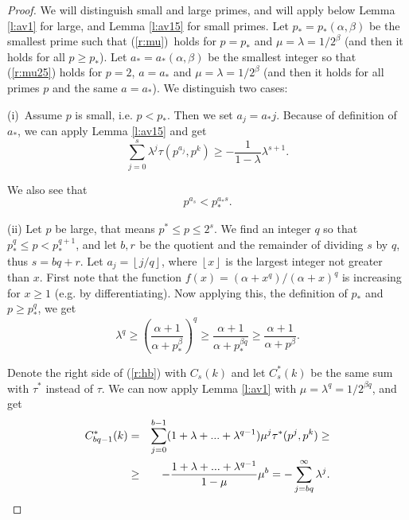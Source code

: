 \documentclass{amsart}
\numberwithin {equation}{section}
\begin{document}
\begin{proof}
We will distinguish small and large primes, and will apply below Lemma \ref{l:av1} for large, and Lemma \ref{l:av15} for small primes. Let $p_{\ast
}=p_{\ast }(\alpha ,\beta )$ be the smallest prime such that (\ref{r:mu})\
holds for $p=p_{\ast }$ and $\mu =\lambda =1/2^{\beta }$ (and then it holds
for all $p\geq p_{\ast }$). Let $a_{\ast }=a_{\ast }(\alpha ,\beta )$ be the
smallest integer so that (\ref{r:mu25}) holds for $p=2$, $a=a_{\ast }$ and $\mu =\lambda =1/2^{\beta }$ (and then it holds for all primes $p$ and the
same $a=a_{\ast }$). We distinguish two cases:

(i)\ Assume $p$ is small, i.e. $p<p_{\ast }$. Then we set $a_{j}=a_{\ast }j$. Because of definition of $a_{\ast }$, we can apply Lemma \ref{l:av15} and
get 
\begin{equation}
\sum _{j=0}^{s}\lambda ^{j}\tau (p^{a_{j}},p^{k})\geq -\frac{1}{1-\lambda }\lambda ^{s+1}{\text {.}}  \label{r:finalA}
\end{equation}

We also see that 
\begin{equation}
p^{a_{s}}<p_{\ast }^{a_{\ast }s}{\text {.}}  \label{r:finalB}
\end{equation}

(ii) Let $p$ be large, that means $p^{\ast }\leq p\leq 2^{s}$. We find an
integer $q$ so that $p_{\ast }^{q}\leq p<p_{\ast }^{q+1}$, and let $b,r\,\ $be the quotient and the remainder of dividing $s$ by $q$, thus $s=bq+r$. Let 
$a_{j}=\left \lfloor j/q\right \rfloor $, where $\left \lfloor
x\right
\rfloor $ is the largest integer not greater than $x$. First note
that the function $f(x)=(\alpha +x^{q})/(\alpha +x)^{q}$ is increasing for $x\geq 1$ (e.g. by differentiating). Now applying this, the definition of $p_{\ast }$ and $p\geq p_{\ast }^{q}$, we get 
\begin{equation}
\lambda ^{q}\geq \left (\frac{\alpha +1}{\alpha +p_{\ast }^{\beta }}\right
)^{q}\geq \frac{\alpha +1}{\alpha +p_{\ast }^{\beta q}}\geq \frac{\alpha +1}{\alpha +p^{\beta }}{\text {.}}  \label{r:mu3}
\end{equation}

Denote the right side of (\ref{r:hb}) with $C_{s}(k)$ and let $C_{s}^*(k)$
be the same sum with $\tau ^*$ instead of $\tau $. We can now apply Lemma \ref{l:av1} with $\mu =\lambda ^{q}=1/2^{\beta q}$, and get 
\begin{eqnarray}
C_{bq-1}^*(k)&=&\sum _{j=0}^{b-1}(1+\lambda +...+\lambda ^{q-1})\mu ^{j}\tau
^*(p^{j},p^{k})\geq  \notag \\
&\geq &-\frac{1+\lambda +...+\lambda ^{q-1}}{1-\mu }\mu ^{b}=-\sum
_{j=bq}^{\infty }\lambda ^{j}{\text {.}}  \label{r:b11}
\end{eqnarray}


\end{proof}
\end{document}
